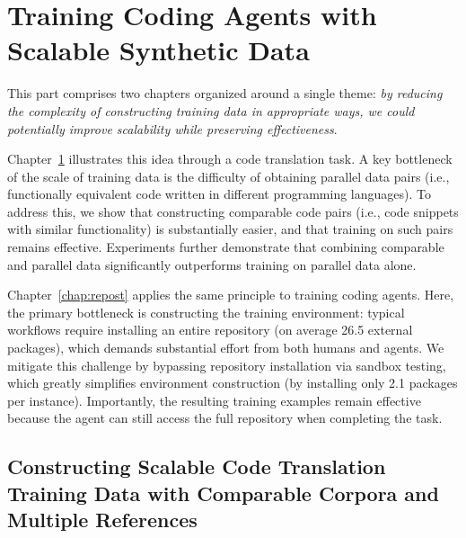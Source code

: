 

\part{Training Coding Agents with Scalable Synthetic Data}
\label{part:scalability}


This part comprises two chapters organized around a single theme: \emph{by reducing the complexity of constructing training data in appropriate ways, we could potentially improve scalability while preserving effectiveness}.
 
Chapter~\ref{chap:cmtrans} illustrates this idea through a code translation task. A key bottleneck of the scale of training data is the difficulty of obtaining parallel data pairs (i.e., functionally equivalent code written in different programming languages).
To address this, we show that constructing comparable code pairs (i.e., code snippets with similar functionality) is substantially easier, and that training on such pairs remains effective. Experiments further demonstrate that combining comparable and parallel data significantly outperforms training on parallel data alone.

Chapter~\ref{chap:repost} applies the same principle to training coding agents. Here, the primary bottleneck is constructing the training environment: typical workflows require installing an entire repository (on average 26.5 external packages), which demands substantial effort from both humans and agents. We mitigate this challenge by bypassing repository installation via sandbox testing, which greatly simplifies environment construction (by installing only 2.1 packages per instance). Importantly, the resulting training examples remain effective because the agent can still access the full repository when completing the task.





\chapter{Constructing Scalable Code Translation Training Data with Comparable Corpora and Multiple References}
\label{chap:cmtrans}


